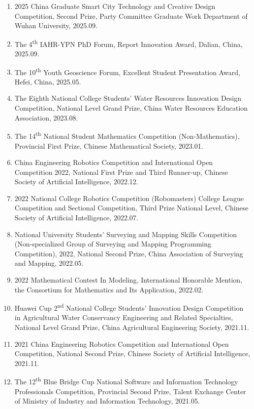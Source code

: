 \documentclass[10pt,a4paper]{article}
\begin{document}
\begin{enumerate}[leftmargin=22pt]
    \item 2025 China Graduate Smart City Technology and Creative Design Competition, Second Prize, Party Committee Graduate Work Department of Wuhan University, 2025.09.
    \item The 4\textsuperscript{th} IAHR-YPN PhD Forum, Report Innovation Award, Dalian, China, 2025.09.
    \item The 10\textsuperscript{th} Youth Geoscience Forum, Excellent Student Presentation Award, Hefei, China, 2025.05.
    \item The Eighth National College Students' Water Resources Innovation Design Competition, National Level Grand Prize, China Water Resources Education Association, 2023.08.
    \item The 14\textsuperscript{th} National Student Mathematics Competition (Non-Mathematics), Provincial First Prize, Chinese Mathematical Society, 2023.01.
    \item China Engineering Robotics Competition and International Open Competition 2022, National First Prize and Third Runner-up, Chinese Society of Artificial Intelligence, 2022.12.
    \item 2022 National College Robotics Competition (Robomasters) College League Competition and Sectional Competition, Third Prize National Level, Chinese Society of Artificial Intelligence, 2022.07.
    \item National University Students' Surveying and Mapping Skills Competition (Non-specialized Group of Surveying and Mapping Programming Competition), 2022, National Second Prize, China Association of Surveying and Mapping, 2022.05.
    \item 2022 Mathematical Contest In Modeling, International Honorable Mention, the Consortium for Mathematics and Its Application, 2022.02.
    \item Huawei Cup 2\textsuperscript{nd} National College Students' Innovation Design Competition in Agricultural Water Conservancy Engineering and Related Specialties, National Level Grand Prize, China Agricultural Engineering Society, 2021.11.
    \item 2021 China Engineering Robotics Competition and International Open Competition, National Second Prize, Chinese Society of Artificial Intelligence, 2021.11.
    \item The 12\textsuperscript{th} Blue Bridge Cup National Software and Information Technology Professionals Competition, Provincial Second Prize, Talent Exchange Center of Ministry of Industry and Information Technology, 2021.05.
\end{enumerate}
\end{document}
